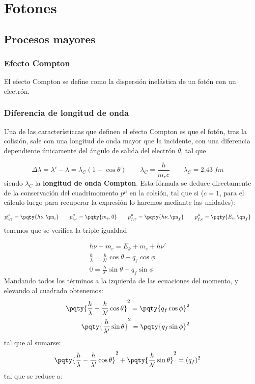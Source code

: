 \chapter{Fotones}

\section{Procesos mayores}

\subsection{Efecto Compton}

El efecto Compton se define como la dispersión inelástica de un fotón con un electrón.

\subsection{Diferencia de longitud de onda}

Una de las característiccas que definen el efecto Compton es que el fotón, tras la colisión, sale con una longitud de onda mayor que la incidente, con una diferencia dependiente únicamente del ángulo de salida del electrón $\theta$, tal que 

\begin{equation}
    \Delta \lambda = \lambda' - \lambda = \lambda_C (1-\cos \theta) \qquad \lambda_C = \frac{h}{m_ec}  \qquad \lambda_C = 2.43 \ \unit{fm}
\end{equation}
siendo $\lambda_C$ la \textbf{longitud de onda Compton}. Esta fórmula se deduce directamente de la conservación del cuadrimomento $p^\mu$ en la colsión, tal que si ($c=1$, para el cálculo luego para recuperar la expresión lo haremos mediante las unidades):

\begin{equation}
    p_{i,\gamma}^\mu = \pqty{h \nu, \pn_i } \qquad 
    p_{i,e}^\mu = \pqty{m_e, 0} \qquad 
    p_{f,\gamma}^\mu = \pqty{h \nu, \pn_f } \qquad 
    p_{f,e}^\mu = \pqty{E_e, \qn_f }
\end{equation}
tenemos que se verifica la triple igualdad

\begin{eqnarray}
    h \nu + m_e = E_k + m_e + h \nu' \\
    \frac{h}{\lambda}= \frac{h}{\lambda'}\cos \theta + q_f \cos \phi  \\
    0 = \frac{h}{\lambda'} \sin \theta + q_f \sin \phi
\end{eqnarray}
Mandando todos los términos a la izquierda de las ecuaciones del momento, y elevando al cuadrado obtenemos: 
\begin{eqnarray}
    \pqty{\frac{h}{\lambda}- \frac{h}{\lambda'}\cos \theta}^2= \pqty{q_f \cos \phi}^2  \\
    \pqty{\frac{h}{\lambda'} \sin \theta}^2 = \pqty{q_f \sin \phi}^2
\end{eqnarray}
tal que al sumarse: 
\begin{equation}
    \pqty{\frac{h}{\lambda}- \frac{h}{\lambda'}\cos \theta}^2+ \pqty{\frac{h}{\lambda'} \sin \theta}^2 = (q_f)^2
\end{equation}
tal que se reduce a: 

